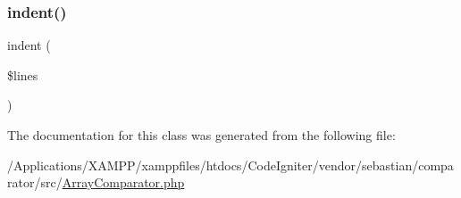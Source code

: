 \subsubsection{\texorpdfstring{indent()}{indent()}}
{\footnotesize\ttfamily indent (\begin{DoxyParamCaption}\item[{}]{\$lines }\end{DoxyParamCaption})\hspace{0.3cm}{\ttfamily [protected]}}



The documentation for this class was generated from the following file\+:\begin{DoxyCompactItemize}
\item 
/\+Applications/\+X\+A\+M\+P\+P/xamppfiles/htdocs/\+Code\+Igniter/vendor/sebastian/comparator/src/\mbox{\hyperlink{_array_comparator_8php}{Array\+Comparator.\+php}}\end{DoxyCompactItemize}
